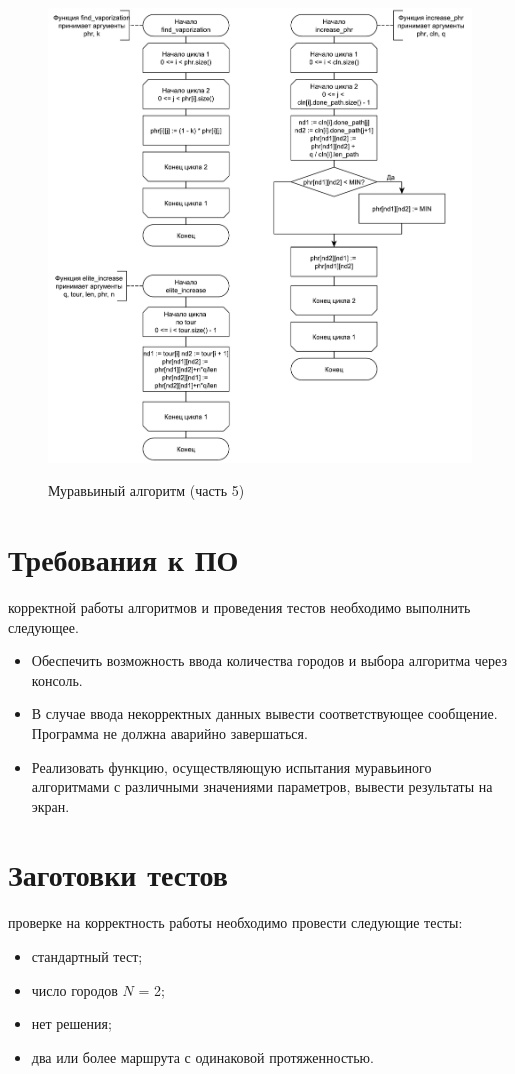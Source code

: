 \begin{figure}[h]
	\begin{center}
		{\includegraphics[scale = 0.6]{schemes/ant5}}
		\caption{Муравьиный алгоритм (часть 5)}
		\label{fig7:image}
	\end{center}
\end{figure}

\section{Требования к ПО}
 корректной работы алгоритмов и проведения тестов необходимо выполнить следующее.
\begin{itemize}
	\item Обеспечить возможность ввода количества городов и выбора алгоритма через консоль.
	\item В случае ввода некорректных данных вывести соответствующее сообщение. Программа не должна аварийно завершаться.
	\item Реализовать функцию, осуществляющую испытания муравьиного алгоритмами с различными значениями параметров, вывести результаты на экран.
\end{itemize}

\section{Заготовки тестов}
 проверке на корректность работы необходимо провести следующие тесты:
\begin{itemize}
	\item стандартный тест;
	\item число городов $N$ = 2;
	\item нет решения;
	\item два или более маршрута с одинаковой протяженностью.
\end{itemize}

